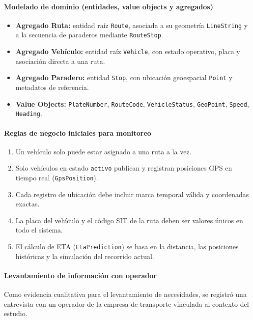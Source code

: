 \paragraph{Modelado de dominio (entidades, value objects y agregados)}
\begin{itemize}
    \item \textbf{Agregado Ruta:} entidad raíz \texttt{Route}, asociada a su geometría \texttt{LineString} y a la secuencia de paraderos mediante \texttt{RouteStop}.
    \item \textbf{Agregado Vehículo:} entidad raíz \texttt{Vehicle}, con estado operativo, placa y asociación directa a una ruta.
    \item \textbf{Agregado Paradero:} entidad \texttt{Stop}, con ubicación geoespacial \texttt{Point} y metadatos de referencia.
    \item \textbf{Value Objects:} \texttt{PlateNumber}, \texttt{RouteCode}, \texttt{VehicleStatus}, \texttt{GeoPoint}, \texttt{Speed}, \texttt{Heading}.
\end{itemize}

\paragraph{Reglas de negocio iniciales para monitoreo}
\begin{enumerate}
    \item Un vehículo solo puede estar asignado a una ruta a la vez.
    \item Solo vehículos en estado \texttt{activo} publican y registran posiciones GPS en tiempo real (\texttt{GpsPosition}).
    \item Cada registro de ubicación debe incluir marca temporal válida y coordenadas exactas.
    \item La placa del vehículo y el código SIT de la ruta deben ser valores únicos en todo el sistema.
    \item El cálculo de ETA (\texttt{EtaPrediction}) se basa en la distancia, las posiciones históricas y la simulación del recorrido actual.
\end{enumerate}

\paragraph{Levantamiento de información con operador}

Como evidencia cualitativa para el levantamiento de necesidades, se registró una entrevista con un operador de la empresa de transporte vinculada al contexto del estudio.

